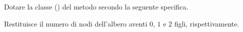 Dotare la classe  () del metodo  secondo la seguente specifica.

\begin{methodslist}

 {
  Restituisce il numero di nodi dell'albero aventi $0$, $1$ e $2$ figli, ris\-pet\-ti\-va\-men\-te.
}

\end{methodslist}